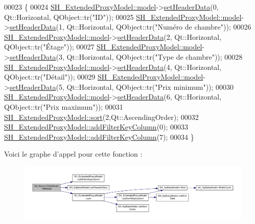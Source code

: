 \begin{DoxyCode}
00023 \{
00024     \hyperlink{classSH__ExtendedProxyModel_a8c8b8930c6b1abd9bbb1dce1fdc9690b}{SH\_ExtendedProxyModel::model}->\hyperlink{classSH__SqlDataModel_aa9ad9f29681bffdec372db4bba0aa82f}{setHeaderData}(0, Qt::Horizontal,
       QObject::tr(\textcolor{stringliteral}{"ID"}));
00025     \hyperlink{classSH__ExtendedProxyModel_a8c8b8930c6b1abd9bbb1dce1fdc9690b}{SH\_ExtendedProxyModel::model}->\hyperlink{classSH__SqlDataModel_aa9ad9f29681bffdec372db4bba0aa82f}{setHeaderData}(1, Qt::Horizontal,
       QObject::tr(\textcolor{stringliteral}{"Numéro de chambre"}));
00026     \hyperlink{classSH__ExtendedProxyModel_a8c8b8930c6b1abd9bbb1dce1fdc9690b}{SH\_ExtendedProxyModel::model}->\hyperlink{classSH__SqlDataModel_aa9ad9f29681bffdec372db4bba0aa82f}{setHeaderData}(2, Qt::Horizontal,
       QObject::tr(\textcolor{stringliteral}{"Étage"}));
00027     \hyperlink{classSH__ExtendedProxyModel_a8c8b8930c6b1abd9bbb1dce1fdc9690b}{SH\_ExtendedProxyModel::model}->\hyperlink{classSH__SqlDataModel_aa9ad9f29681bffdec372db4bba0aa82f}{setHeaderData}(3, Qt::Horizontal,
       QObject::tr(\textcolor{stringliteral}{"Type de chambre"}));
00028     \hyperlink{classSH__ExtendedProxyModel_a8c8b8930c6b1abd9bbb1dce1fdc9690b}{SH\_ExtendedProxyModel::model}->\hyperlink{classSH__SqlDataModel_aa9ad9f29681bffdec372db4bba0aa82f}{setHeaderData}(4, Qt::Horizontal,
       QObject::tr(\textcolor{stringliteral}{"Détail"}));
00029     \hyperlink{classSH__ExtendedProxyModel_a8c8b8930c6b1abd9bbb1dce1fdc9690b}{SH\_ExtendedProxyModel::model}->\hyperlink{classSH__SqlDataModel_aa9ad9f29681bffdec372db4bba0aa82f}{setHeaderData}(5, Qt::Horizontal,
       QObject::tr(\textcolor{stringliteral}{"Prix minimum"}));
00030     \hyperlink{classSH__ExtendedProxyModel_a8c8b8930c6b1abd9bbb1dce1fdc9690b}{SH\_ExtendedProxyModel::model}->\hyperlink{classSH__SqlDataModel_aa9ad9f29681bffdec372db4bba0aa82f}{setHeaderData}(6, Qt::Horizontal,
       QObject::tr(\textcolor{stringliteral}{"Prix maximum"}));
00031     \hyperlink{classSH__ExtendedProxyModel_a5ed9b14df78667efe8b22d19617d6c4b}{SH\_ExtendedProxyModel::sort}(2,Qt::AscendingOrder);
00032     \hyperlink{classSH__ExtendedProxyModel_a4e98e24b6b94adf31a2c5e935a48f831}{SH\_ExtendedProxyModel::addFilterKeyColumn}(0);
00033     \hyperlink{classSH__ExtendedProxyModel_a4e98e24b6b94adf31a2c5e935a48f831}{SH\_ExtendedProxyModel::addFilterKeyColumn}(7);
00034 \}
\end{DoxyCode}


Voici le graphe d'appel pour cette fonction \-:
\nopagebreak
\begin{figure}[H]
\begin{center}
\leavevmode
\includegraphics[width=350pt]{classSH__RoomsTableModel_ac11a4147485348d4504a8508e6bb5398_cgraph}
\end{center}
\end{figure}


